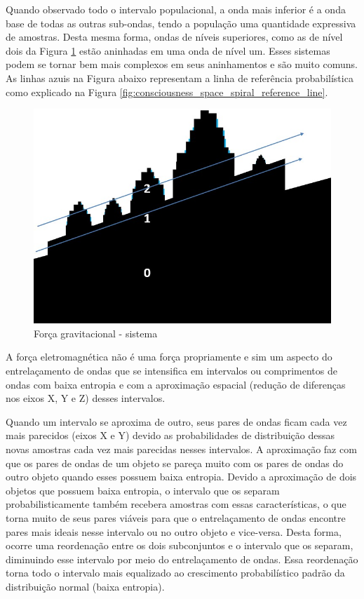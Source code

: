 Quando observado todo o intervalo populacional, a onda mais inferior é a onda base de todas as outras sub-ondas, tendo a população uma quantidade expressiva de amostras. Desta mesma forma, ondas de níveis superiores, como as de nível dois da Figura \ref{fig:consciousness_gravitational_force_system} estão aninhadas em uma onda de nível um. Esses sistemas podem se tornar bem mais complexos em seus aninhamentos e são muito comuns. As linhas azuis na Figura abaixo representam a linha de referência probabilística como explicado na Figura \ref{fig:consciousness_space_spiral_reference_line}.
	\begin{figure}[H]
	\caption{Força gravitacional - sistema}
	\label{fig:consciousness_gravitational_force_system}
	\centering
	\includegraphics[scale=.6]{sections/images/consciousness_gravitational_force_system.jpg}
	\end{figure}

A força eletromagnética não é uma força propriamente e sim um aspecto do entrelaçamento de ondas que se intensifica em intervalos ou comprimentos de ondas com baixa entropia e com a aproximação espacial (redução de diferenças nos eixos X, Y e Z) desses intervalos.

Quando um intervalo se aproxima de outro, seus pares de ondas ficam cada vez mais parecidos (eixos X e Y) devido as probabilidades de distribuição dessas novas amostras cada vez mais parecidas nesses intervalos. A aproximação faz com que os pares de ondas de um objeto se pareça muito com os pares de ondas do outro objeto quando esses possuem baixa entropia. Devido a aproximação de dois objetos que possuem baixa entropia, o intervalo que os separam probabilisticamente também recebera amostras com essas características, o que torna muito de seus pares viáveis para que o entrelaçamento de ondas encontre pares mais ideais nesse intervalo ou no outro objeto e vice-versa. Desta forma, ocorre uma reordenação entre os dois subconjuntos e o intervalo que os separam, diminuindo esse intervalo por meio do entrelaçamento de ondas. Essa reordenação torna todo o intervalo mais equalizado ao crescimento probabilístico padrão da distribuição normal (baixa entropia).

